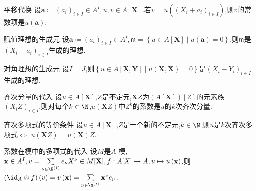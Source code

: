 \begin{proposition}{平移代换}{}
	设$\mathbf{a}\coloneq\left(a_{i}\right)_{i\in I}\in A^{I},u,v\in A[\mathbf{X}]$.若$v=u\left(\left(X_{i}+a_{i}\right)_{i\in I}\right)$,则$v$的常数项是$u\left(\mathbf{a}\right)$.
\end{proposition}

\begin{corollary}{赋值理想的生成元}{}
	设$\mathbf{a}\coloneq\left(a_{i}\right)_{i\in I}\in A^{I},\mathfrak{m}=\left\{u\in A[\mathbf{X}]\middle|u\left(\mathbf{a}\right)=0\right\}$,则$\mathfrak{m}$是$\left(X_{i}-a_{i}\right)_{i\in I}$生成的理想.
\end{corollary}

\begin{corollary}{对角理想的生成元}{}
	设$I=J$,则$\left\{u\in A[\mathbf{X},\mathbf{Y}]\middle|u\left(\mathbf{X},\mathbf{X}\right)=0\right\}$是$\left(X_{i}-Y_{i}\right)_{i\in I}$生成的理想.
\end{corollary}

\begin{proposition}{齐次分量的代入}{}
	设$u\in A[\mathbf{X}]$,$Z$是不定元,$\mathbf{X}Z$为$(A[\mathbf{X}])[Z]$的元素族$\left(X_{i}Z\right)_{i\in I}$,则对每个$k\in\N$,$u\left(\mathbf{X}Z\right)$中$Z^{k}$的系数是$u$的$k$次齐次分量.
\end{proposition}

\begin{proposition}{齐次多项式的等价条件}{}
	设$u\in A[\mathbf{X}]$,$Z$是一个新的不定元,$k\in\N$,则$u$是$k$次齐次多项式$\iff$ $u\left(\mathbf{X}Z\right)=u\left(\mathbf{X}\right)Z$.
\end{proposition}

\begin{proposition}{系数在模中的多项式的代入}{}
	设$M$是$A$-模,$\mathbf{x}\in A^{I},v=\sum\limits_{\nu\in\N^{\left(I\right)}}e_{\nu}X^{\nu}\in M[\mathbf{X}],f:A[X]\to A,u\mapsto u\left(\mathbf{x}\right)$,则$\left(\id_{A}\otimes f\right)\left(v\right)=v\left(\mathbf{x}\right)=\sum\limits_{\nu\in\N^{\left(I\right)}}\mathbf{x}^{\nu}e_{\nu}$.
\end{proposition}
















